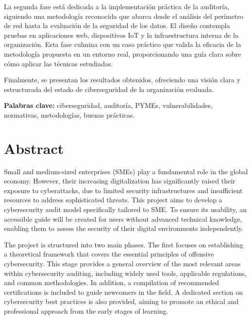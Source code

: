 \documentclass[a4paper, 11pt]{article}
\begin{document}
\par\vspace{0.5cm}

La segunda fase está dedicada a la implementación práctica de la auditoría, siguiendo una metodología reconocida que abarca desde el análisis del perímetro de red hasta la evaluación de la seguridad de los datos. El diseño contempla pruebas en aplicaciones web, dispositivos IoT y la infraestructura interna de la organización. Esta fase culmina con un caso práctico que valida la eficacia de la metodología propuesta en un entorno real, proporcionando una guía clara sobre cómo aplicar las técnicas estudiadas.

\par\vspace{0.5cm}

Finalmente, se presentan los resultados obtenidos, ofreciendo una visión clara y estructurada del estado de ciberseguridad de la organización evaluada.
\par\vspace{0.5cm}
\textbf{Palabras clave:} ciberseguridad, auditoría, PYMEs, vulnerabilidades, normativas, metodologías, buenas prácticas.
\clearpage


\section*{Abstract}
\thispagestyle{empty}
Small and medium-sized enterprises (SMEs) play a fundamental role in the global economy. However, their increasing digitalization has significantly raised their exposure to cyberattacks, due to limited security infrastructures and insufficient resources to address sophisticated threats.
This project aims to develop a cybersecurity audit model specifically tailored to SME. To ensure its usability, an accessible guide will be created for users without advanced technical knowledge, enabling them to assess the security of their digital environments independently.

\par\vspace{0.5cm}

The project is structured into two main phases. The first focuses on establishing a theoretical framework that covers the essential principles of offensive cybersecurity. This stage provides a general overview of the most relevant areas within cybersecurity auditing, including widely used tools, applicable regulations, and common methodologies. In addition, a compilation of recommended certifications is included to guide newcomers in the field. A dedicated section on cybersecurity best practices is also provided, aiming to promote an ethical and professional approach from the early stages of learning.
\end{document}
